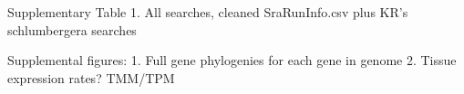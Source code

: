 \documentclass[fleqn,10pt,lineno]{wlpeerj}
\begin{document}

Supplementary Table 1. All searches, cleaned SraRunInfo.csv plus KR's schlumbergera searches


Supplemental figures:
1. Full gene phylogenies for each gene in genome
2. Tissue expression rates? TMM/TPM



\end{document}
